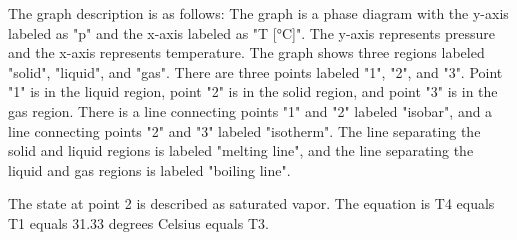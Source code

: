The graph description is as follows: The graph is a phase diagram with the y-axis labeled as "p" and the x-axis labeled as "T [°C]". The y-axis represents pressure and the x-axis represents temperature. The graph shows three regions labeled "solid", "liquid", and "gas". There are three points labeled "1", "2", and "3". Point "1" is in the liquid region, point "2" is in the solid region, and point "3" is in the gas region. There is a line connecting points "1" and "2" labeled "isobar", and a line connecting points "2" and "3" labeled "isotherm". The line separating the solid and liquid regions is labeled "melting line", and the line separating the liquid and gas regions is labeled "boiling line".

The state at point 2 is described as saturated vapor. The equation is T4 equals T1 equals 31.33 degrees Celsius equals T3.